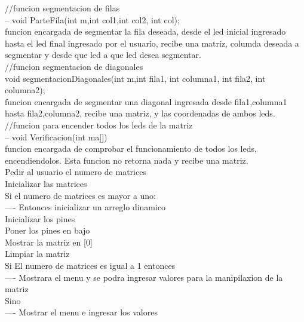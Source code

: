 \documentclass{article}
\begin{document}
//funcion segmentacion de filas \\
 -- void ParteFila(int m,int col1,int col2, int col); \\
funcion encargada de segmentar la fila deseada, desde el led inicial ingresado hasta el led final ingresado por el usuario, recibe una matriz, columda deseada a segmentar y desde que led a que led desea segmentar. \\

//funcion segmentacion de diagonales \\
void segmentacionDiagonales(int m,int fila1, int columna1, int fila2, int columna2); \\
funcion encargada de segmentar una diagonal ingresada desde fila1,columna1 hasta fila2,columna2, recibe una matriz, y las coordenadas de ambos leds. \\


//funcion para encender todos los leds de la matriz \\
-- void Verificacion(int ma[]) \\
funcion encargada de comprobar el funcionamiento de todos los leds, encendiendolos. Esta funcion no retorna nada y recibe una matriz. \\

Pedir al usuario el numero de matrices\\

Inicializar las matrices\\

Si el numero de matrices es mayor a uno:\\

---- Entonces inicializar un arreglo dinamico\\

Inicializar los pines\\

Poner los pines en bajo\\

Mostrar la matriz en [0]\\

Limpiar la matriz\\

Si El numero de matrices es igual a 1 entonces\\

---- Mostrara el menu y se podra ingresar valores para la manipilaxion de la matriz \\

Sino\\

---- Mostrar el menu e ingresar los valores\\
\end{document}
